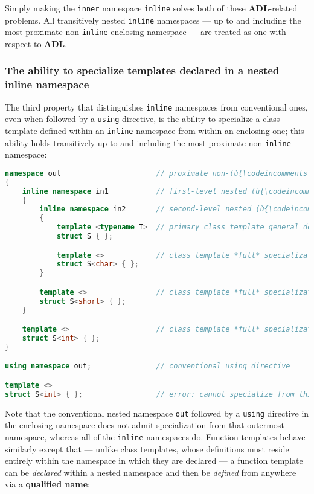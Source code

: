 Simply making the \texttt{inner} namespace \texttt{inline} solves both
of these \textbf{ADL}-related problems. All transitively nested
\texttt{inline} namespaces --- up to and including the most proximate
non-\texttt{inline} enclosing namespace --- are treated as one with
respect to \textbf{ADL}.

\subsubsection[The ability to specialize templates declared in a nested {\tt inline} namespace]{The ability to specialize templates declared in a nested {\SubsubsecCode inline} namespace}\label{the-ability-to-specialize-templates-declared-in-a-nested-inline-namespace}

The third property that distinguishes \texttt{inline} namespaces from
conventional ones, even when followed by a \texttt{using} directive, is
the ability to specialize a class template defined within an
\texttt{inline} namespace from within an enclosing one; this ability
holds transitively up to and including the most proximate
non-\texttt{inline} namespace:

\begin{lstlisting}[language=C++]
namespace out                      // proximate non-(ù{\codeincomments{inline}}ù) outer namespace
{
    inline namespace in1           // first-level nested (ù{\codeincomments{inline}}ù) namespace
    {
        inline namespace in2       // second-level nested (ù{\codeincomments{inline}}ù) namespace
        {
            template <typename T>  // primary class template general definition
            struct S { };

            template <>            // class template *full* specialization
            struct S<char> { };
        }

        template <>                // class template *full* specialization
        struct S<short> { };
    }

    template <>                    // class template *full* specialization
    struct S<int> { };
}

using namespace out;               // conventional using directive

template <>
struct S<int> { };                 // error: cannot specialize from this scope
\end{lstlisting}

\noindent Note that the conventional nested namespace \texttt{out} followed by a
\texttt{using} directive in the enclosing namespace does not admit
specialization from that outermost namespace, whereas all of the
\texttt{inline} namespaces do. Function templates behave similarly
except that --- unlike class templates, whose definitions must reside
entirely within the namespace in which they are declared --- a function
template can be \emph{declared} within a nested namespace and then be
\emph{defined} from anywhere via a \textbf{qualified name}:

